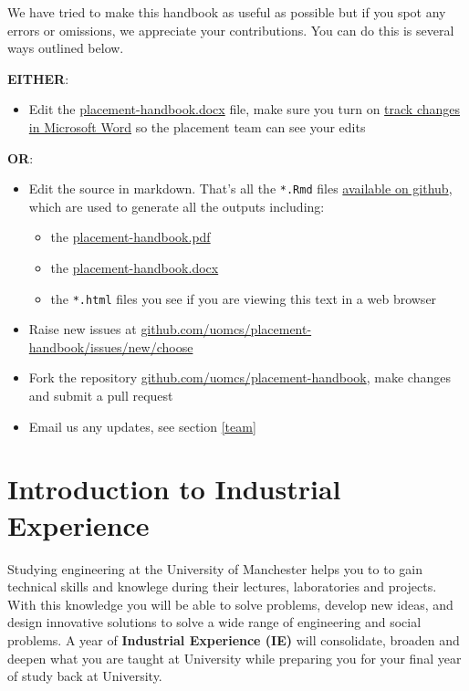 \documentclass[
]{book}
\providecommand{\tightlist}{%
  \setlength{\itemsep}{0pt}\setlength{\parskip}{0pt}}
\begin{document}
We have tried to make this handbook as useful as possible but if you spot any errors or omissions, we appreciate your contributions. You can do this is several ways outlined below.

\textbf{EITHER}:

\begin{itemize}
\tightlist
\item
  Edit the \url{placement-handbook.docx} file, make sure you turn on \href{https://support.microsoft.com/en-gb/office/track-changes-in-word-197ba630-0f5f-4a8e-9a77-3712475e806a}{track changes in Microsoft Word} so the placement team can see your edits
\end{itemize}

\textbf{OR}:

\begin{itemize}
\tightlist
\item
  Edit the source in markdown. That's all the \texttt{*.Rmd} files \href{https://github.com/search?q=repo\%3AUoMCS\%2Fplacement-handbook++language\%3ARMarkdown&type=code}{available on github}, which are used to generate all the outputs including:

  \begin{itemize}
  \tightlist
  \item
    the \url{placement-handbook.pdf}
  \item
    the \url{placement-handbook.docx}
  \item
    the \texttt{*.html} files you see if you are viewing this text in a web browser
  \end{itemize}
\item
  Raise new issues at \href{https://github.com/uomcs/placement-handbook/issues/new/choose}{github.com/uomcs/placement-handbook/issues/new/choose}
\item
  Fork the repository \href{https://github.com/uomcs/placement-handbook}{github.com/uomcs/placement-handbook}, make changes and submit a pull request
\item
  Email us any updates, see section \ref{team}
\end{itemize}

\chapter{Introduction to Industrial Experience}\label{intro}

Studying engineering at the University of Manchester helps you to to gain technical skills and knowlege during their lectures, laboratories and projects. With this knowledge you will be able to solve problems, develop new ideas, and design innovative solutions to solve a wide range of engineering and social problems. A year of \textbf{Industrial Experience (IE)} will consolidate, broaden and deepen what you are taught at University while preparing you for your final year of study back at University.
\end{document}
